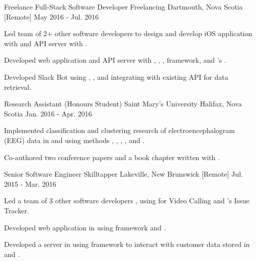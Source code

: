 \begin{cventries}
  \cventry
    {Freelance Full-Stack Software Developer} %
    {Freelancing} %
    {Dartmouth, Nova Scotia [Remote]} %
    {May 2016 - Jul. 2016} %
    {
      \begin{cvitems} %
        \item {Led team of 2+ other software developers to design and develop iOS application with  and  API server with .}
        \item {Developed web application and  API server with , , ,  framework, and 's .}
        \item {Developed Slack Bot using , , and  integrating with existing API for data retrieval.}
      \end{cvitems}
    }

  \cventry
    {Research Assistant (Honours Student)} %
    {Saint Mary's University} %
    {Halifax, Nova Scotia} %
    {Jan. 2016 - Apr. 2016} %
    {
      \begin{cvitems} %
        \item {Implemented classification and clustering research of electroencephalogram (EEG) data in  and  using methods , , , , and .}
        \item {Co-authored two conference papers and a book chapter written with .}
      \end{cvitems}
    }

  \cventry
    {Senior Software Engineer} %
    {Skilltapper} %
    {Lakeville, New Brunswick [Remote]} %
    {Jul. 2015 - Mar. 2016} %
    {
      \begin{cvitems} %
        \item {Led a team of 3 other software developers , using  for Video Calling and 's Issue Tracker.}
        \item {Developed web application in  using  framework and .}
        \item {Developed a  server in  using  framework to interact with customer data stored in  and .}
      \end{cvitems}
    }


\end{cventries}
